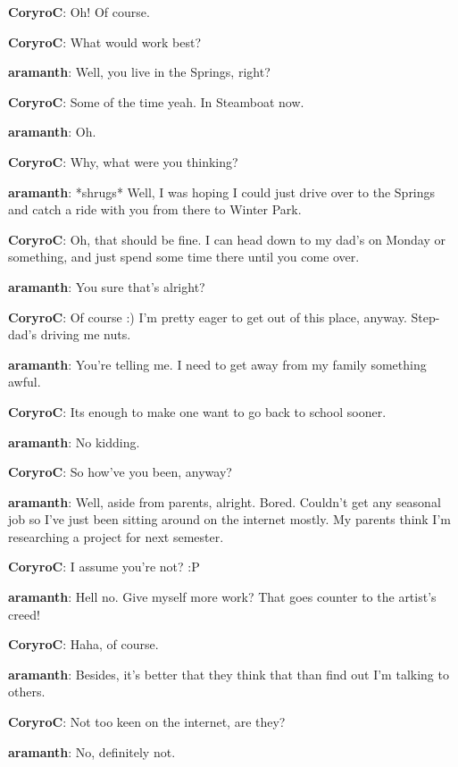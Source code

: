 \textbf{\color{blue}CoryroC}: Oh!  Of course.

\textbf{\color{blue}CoryroC}: What would work best?

\textbf{\color{red}aramanth}: Well, you live in the Springs, right?

\textbf{\color{blue}CoryroC}: Some of the time yeah.  In Steamboat now.

\textbf{\color{red}aramanth}: Oh.

\textbf{\color{blue}CoryroC}: Why, what were you thinking?

\textbf{\color{red}aramanth}: *shrugs*  Well, I was hoping I could just drive over to the Springs and catch a ride with you from there to Winter Park.

\textbf{\color{blue}CoryroC}: Oh, that should be fine.  I can head down to my dad's on Monday or something, and just spend some time there until you come over.

\textbf{\color{red}aramanth}: You sure that's alright?

\textbf{\color{blue}CoryroC}: Of course :)  I'm pretty eager to get out of this place, anyway.  Step-dad's driving me nuts.

\textbf{\color{red}aramanth}: You're telling me.  I need to get away from my family something awful.

\textbf{\color{blue}CoryroC}: Its enough to make one want to go back to school sooner.

\textbf{\color{red}aramanth}: No kidding.

\textbf{\color{blue}CoryroC}: So how've you been, anyway?

\textbf{\color{red}aramanth}: Well, aside from parents, alright.  Bored.  Couldn't get any seasonal job so I've just been sitting around on the internet mostly.  My parents think I'm researching a project for next semester.

\textbf{\color{blue}CoryroC}: I assume you're not? :P

\textbf{\color{red}aramanth}: Hell no.  Give myself more work?  That goes counter to the artist's creed!

\textbf{\color{blue}CoryroC}: Haha, of course.

\textbf{\color{red}aramanth}: Besides, it's better that they think that than find out I'm talking to others.

\textbf{\color{blue}CoryroC}: Not too keen on the internet, are they?

\textbf{\color{red}aramanth}: No, definitely not.

